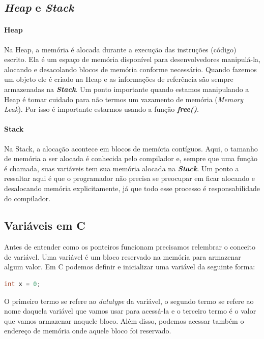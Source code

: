 \subsection{\textit{Heap} e \textit{Stack}}

\paragraph{Heap} Na Heap, a memória é alocada durante a execução das instruções (código) escrito.
Ela é um espaço de memória disponível para desenvolvedores manipulá-la, alocando e desacolando
blocos de memória conforme necessário. Quando fazemos um objeto ele é criado na Heap e as
informações de referência são sempre armazenadas na \textbf{\textit{Stack}}. Um ponto importante quando
estamos manipulando a Heap é tomar cuidado para não termos um vazamento de memória (\textit{Memory
Leak}). Por isso é importante estarmos usando a função \textbf{\textit{free()}}.

\paragraph{Stack} Na Stack, a alocação acontece em blocos de memória contíguos. Aqui, o tamanho de
memória a ser alocada é conhecida pelo compilador e, sempre que uma função é chamada, suas variáveis
tem sua memória alocada na \textbf{\textit{Stack}}. Um ponto a ressaltar aqui é que o programador não precisa
se preocupar em ficar alocando e desalocando memória explicitamente, já que todo esse processo é
responsabilidade do compilador.
\subsection{Variáveis em C}

Antes de entender como os ponteiros funcionam precisamos relembrar o conceito de variável.
Uma variável é um bloco reservado na memória para armazenar algum valor. Em C podemos definir e inicializar
uma variável da seguinte forma:

\begin{lstlisting}[language=C]
int x = 0;
\end{lstlisting}

O primeiro termo se refere ao \textit{datatype} da variável, o segundo termo se refere ao nome daquela
variável que vamos usar para acessá-la e o terceiro termo é o valor que vamos armazenar naquele bloco. Além disso, podemos acessar também o endereço de memória onde
aquele bloco foi reservado.

